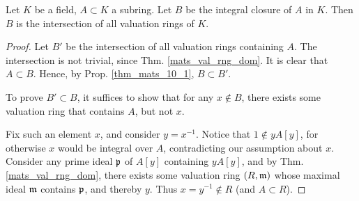 \begin{thm}\label{thm_int_cls_val_rng}
Let $K$ be a field, $A \subset K$ a subring. Let $B$ be the 
integral closure of $A$ in $K$. Then $B$ is the intersection of
all valuation rings of $K$.
\end{thm}
\begin{proof}
Let $B'$ be the intersection of all valuation rings containing 
$A$. The intersection is not trivial, since Thm. 
\ref{mats_val_rng_dom}. It is clear that $A \subset B$. Hence, by
Prop. \ref{thm_mats_10_1}, $B \subset B'$. 

To prove $B' \subset B$, it suffices to show that for any $x 
\notin B$, there exists some valuation ring that contains $A$, 
but not $x$. 

Fix such an element $x$, and consider $y = x^{-1}$. Notice that
$1 \notin yA[y]$, for otherwise $x$ would be integral over $A$,
contradicting our assumption about $x$. Consider any prime ideal
$\mathfrak{p}$ of $A[y]$ containing $yA[y]$, and by Thm. 
\ref{mats_val_rng_dom}, there exists some valuation ring $(R, 
\mathfrak{m})$ whose maximal ideal $\mathfrak{m}$ contains $\mathfrak{p}$, 
and thereby $y$. Thus $x = y^{-1} \notin R$ (and $A \subset R$).
\end{proof}
